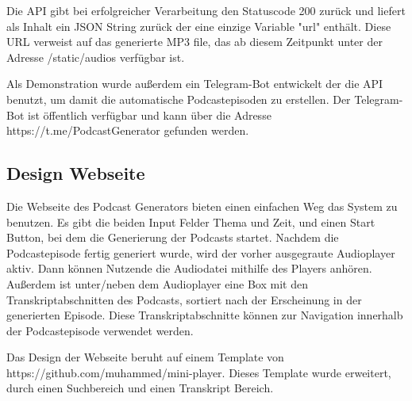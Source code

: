Die API gibt bei erfolgreicher Verarbeitung den Statuscode 200 zurück und liefert als Inhalt ein JSON String zurück der eine einzige Variable "url" enthält.
Diese URL verweist auf das generierte MP3 file, das ab diesem Zeitpunkt unter der Adresse /static/audios verfügbar ist.

Als Demonstration wurde außerdem ein Telegram-Bot entwickelt der die API benutzt, um damit die automatische Podcastepisoden zu erstellen.
Der Telegram-Bot ist öffentlich verfügbar und kann über die Adresse https://t.me/PodcastGenerator gefunden werden.

\subsection{Design Webseite}

Die Webseite des Podcast Generators bieten einen einfachen Weg das System zu benutzen.
Es gibt die beiden Input Felder Thema und Zeit, und einen Start Button, bei dem die Generierung der Podcasts startet.
Nachdem die Podcastepisode fertig generiert wurde, wird der vorher ausgegraute Audioplayer aktiv.
Dann können Nutzende die Audiodatei mithilfe des Players anhören.
Außerdem ist unter/neben dem Audioplayer eine Box mit den Transkriptabschnitten des Podcasts, sortiert nach der Erscheinung in der generierten Episode.
Diese Transkriptabschnitte können zur Navigation innerhalb der Podcastepisode verwendet werden.


Das Design der Webseite beruht auf einem Template von https://github.com/muhammed/mini-player.
Dieses Template wurde erweitert, durch einen Suchbereich und einen Transkript Bereich.



